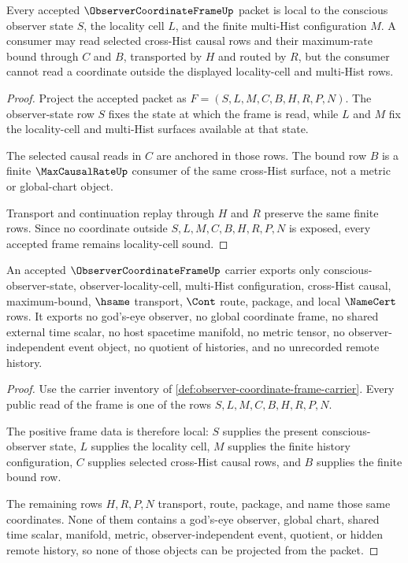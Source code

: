 \begin{theorem}
\label{thm:observer-coordinate-frame-locality-soundness}
Every accepted $\ObserverCoordinateFrameUp$ packet is local to the conscious observer state $S$, the locality cell $L$, and the finite multi-Hist configuration $M$. A consumer may read selected cross-Hist causal rows and their maximum-rate bound through $C$ and $B$, transported by $H$ and routed by $R$, but the consumer cannot read a coordinate outside the displayed locality-cell and multi-Hist rows.
\end{theorem}
\begin{proof}
Project the accepted packet as $F=(S,L,M,C,B,H,R,P,N)$. The observer-state row $S$ fixes the state at which the frame is read, while $L$ and $M$ fix the locality-cell and multi-Hist surfaces available at that state.

The selected causal reads in $C$ are anchored in those rows. The bound row $B$ is a finite $\MaxCausalRateUp$ consumer of the same cross-Hist surface, not a metric or global-chart object.

Transport and continuation replay through $H$ and $R$ preserve the same finite rows. Since no coordinate outside $S,L,M,C,B,H,R,P,N$ is exposed, every accepted frame remains locality-cell sound.
\end{proof}

\begin{theorem}
\label{thm:observer-coordinate-frame-non-global-frame-boundary}
An accepted $\ObserverCoordinateFrameUp$ carrier exports only conscious-observer-state, observer-locality-cell, multi-Hist configuration, cross-Hist causal, maximum-bound, $\hsame$ transport, $\Cont$ route, package, and local $\NameCert$ rows. It exports no god's-eye observer, no global coordinate frame, no shared external time scalar, no host spacetime manifold, no metric tensor, no observer-independent event object, no quotient of histories, and no unrecorded remote history.
\end{theorem}
\begin{proof}
Use the carrier inventory of \autoref{def:observer-coordinate-frame-carrier}. Every public read of the frame is one of the rows $S,L,M,C,B,H,R,P,N$.

The positive frame data is therefore local: $S$ supplies the present conscious-observer state, $L$ supplies the locality cell, $M$ supplies the finite history configuration, $C$ supplies selected cross-Hist causal rows, and $B$ supplies the finite bound row.

The remaining rows $H,R,P,N$ transport, route, package, and name those same coordinates. None of them contains a god's-eye observer, global chart, shared time scalar, manifold, metric, observer-independent event, quotient, or hidden remote history, so none of those objects can be projected from the packet.
\end{proof}

